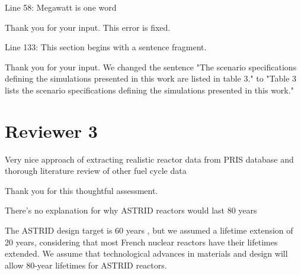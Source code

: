 \documentclass[answers,11pt]{exam}
\begin{document}
\begin{questions}
\begin{solution}
        \end{solution}

        \question Line 58: Megawatt is one word
        \begin{solution}
                Thank you for your input. This error is fixed.
        \end{solution}

        \question Line 133: This section begins with a sentence fragment.

        \begin{solution}
                Thank you for your input. We changed the sentence
                "The scenario specifications defining the simulations
                presented in this work are listed in table 3."
                to
                "Table 3 lists the scenario specifications defining the
                simulations presented in this work."
        \end{solution}


        \section*{Reviewer 3}
        \question Very nice approach of extracting realistic reactor data from 
        PRIS database and thorough literature review of other fuel cycle data
        \begin{solution}
                Thank you for this thoughtful assessment.
        \end{solution}


        \question There's no explanation for why ASTRID reactors would last 80 
        years

        \begin{solution}
                The ASTRID design target is 60 years \cite{gauche_generation_2012},
                but we assumed a lifetime
                extension of 20 years, considering that most French nuclear reactors
                have their lifetimes extended. We assume that technological
                advances in materials and design will allow 80-year lifetimes
                for ASTRID reactors.
        \end{solution}


\end{questions}
\end{document}

